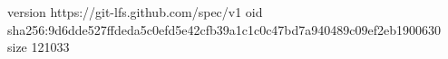 version https://git-lfs.github.com/spec/v1
oid sha256:9d6dde527ffdeda5c0efd5e42cfb39a1c1c0c47bd7a940489c09ef2eb1900630
size 121033
